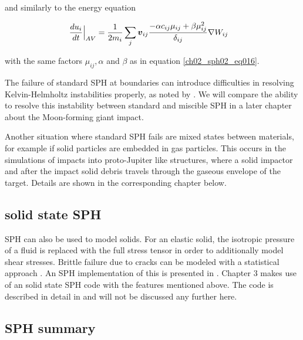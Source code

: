 and similarly to the energy equation

\begin{align}
\label{ch02_sph01_eq035}
\frac{du_i}{dt}  \Big|_{AV} = \frac{1}{2 m_i} & \sum_{j} \boldsymbol{v}_{ij} \frac{- \alpha c_{ij} \mu_{ij} +  \beta \mu_{ij}^2 }{\delta_{ij} } \nabla W_{ij}
\end{align}

with the same factors $\mu_{ij}, \alpha$ and $\beta$ as in equation \ref{ch02_sph02_eq016}. 

The failure of standard SPH at boundaries can introduce difficulties in resolving Kelvin-Helmholtz instabilities properly, as noted by \cite{Agertz:2006p1552}. We will compare the ability to resolve this instability between standard and miscible SPH in a later chapter about the Moon-forming giant impact.

Another situation where standard SPH fails are mixed states between materials, for example if solid particles are embedded in gas particles. This occurs in the simulations of impacts into proto-Jupiter like structures, where a solid impactor and after the impact solid debris travels through the gaseous envelope of the target. Details are shown in the corresponding chapter below. 


\subsection{solid state SPH}
SPH can also be used to model solids. For an elastic solid, the isotropic pressure of a fluid is replaced with the full stress tensor in order to additionally model shear stresses. Brittle failure due to cracks can be modeled with a statistical approach \citep{Grady1980147}. An SPH implementation of this is presented in \citep{1994Icar..107...98B}. %
Chapter 3 makes use of an solid state SPH code with the features mentioned above. The code is described in detail in \citep{Nyffeler:2006p96} and will not be discussed any further here.

\subsection{SPH summary}


